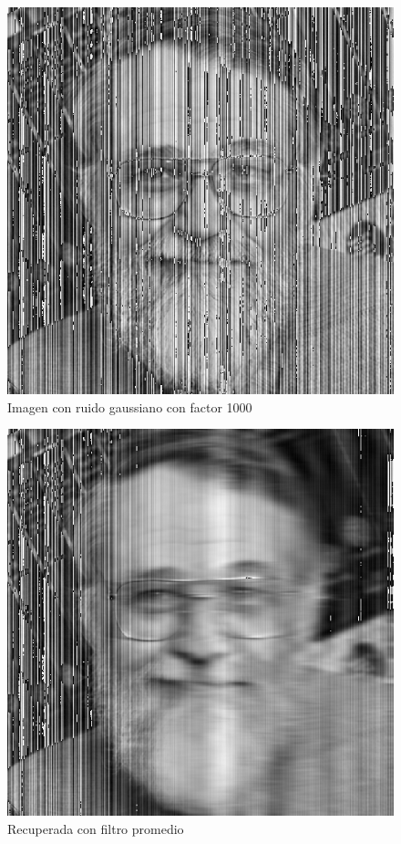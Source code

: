 \begin{figure}[H]
\begin {center}
\includegraphics[width=360pt]{imagenes/kern-gauss100-noisy.png}
\end {center}
\caption{Imagen con ruido gaussiano con factor 1000}
\label{fig:SinProm}
\end{figure}

\begin{figure}[H]
\begin {center}
\includegraphics[width=360pt]{imagenes/kern-gauss100-recovered-avg.png}
\end {center}
\caption{Recuperada con filtro promedio}
\label{fig:SinProm}
\end{figure}

